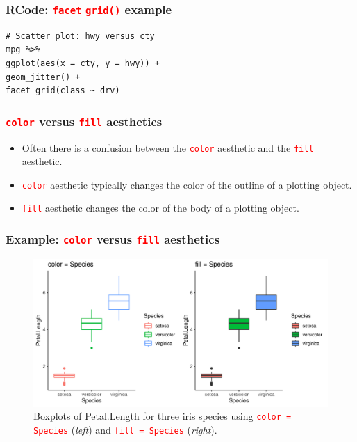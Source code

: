 \documentclass{beamer}
\begin{document}
\begin{frame}[fragile]\frametitle{RCode: \texttt{\textcolor{red}{facet}$\_$\textcolor{red}{grid()}} example}
\lstset{basicstyle=\Large\ttfamily}
\begin{lstlisting}
# Scatter plot: hwy versus cty
mpg %>%
ggplot(aes(x = cty, y = hwy)) +
geom_jitter() +
facet_grid(class ~ drv)
\end{lstlisting}
\end{frame}

\begin{frame}\frametitle{\textcolor{red}{\texttt{color}} versus \textcolor{red}{\texttt{fill}} aesthetics}
\begin{itemize}
\item Often there is a confusion between the \textcolor{red}{\texttt{color}} aesthetic and the \textcolor{red}{\texttt{fill}} aesthetic.
\vspace{0.3in}
\item<2-> \textcolor{red}{\texttt{color}} aesthetic typically changes the color of the outline of a plotting object.
\vspace{0.3in}
\item<3-> \textcolor{red}{\texttt{fill}} aesthetic changes the color of the body of a plotting object.
\end{itemize}
\end{frame}

\begin{frame}\frametitle{Example: \textcolor{red}{\texttt{color}} versus \textcolor{red}{\texttt{fill}} aesthetics}
\begin{figure}
\includegraphics[width=0.99\linewidth]{PlotsLec2/bxplt_ex1}
\caption{\small{Boxplots of Petal.Length for three iris species using \textcolor{red}{\texttt{color = Species}} (\textit{left}) and \textcolor{red}{\texttt{fill = Species}} (\textit{right}).}}
\end{figure}
\end{frame}
\end{document}
